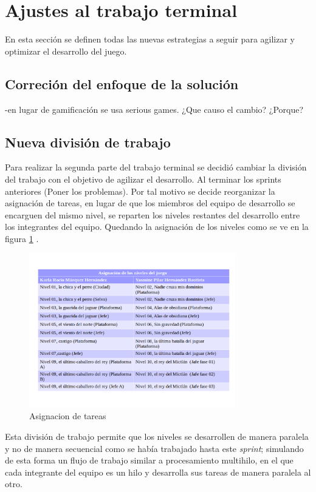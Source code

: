 \section{Ajustes al trabajo terminal}
En esta sección se definen todas las nuevas estrategias a seguir para agilizar y 
optimizar el desarrollo del juego.

\subsection{Correción del enfoque de la solución}
-en lugar de gamificación se usa serious games. ¿Que causo el cambio? ¿Porque?


\subsection{Nueva división de trabajo}
Para realizar la segunda parte del trabajo terminal se decidió cambiar la división del trabajo con el objetivo de agilizar el desarrollo. Al terminar los sprints anteriores (Poner los problemas). Por tal motivo se decide reorganizar la asignación de 
tareas, en lugar de que los miembros del equipo de desarrollo se encarguen del 
mismo nivel, se reparten los niveles restantes del desarrollo entre los 
integrantes del equipo. Quedando la asignación de los niveles como se ve en la 
figura \ref{fig:Tareas} .

		\begin{figure}[h]
    			\centering
    			\includegraphics[width=0.8\textwidth]{02Antecedentes/Imagenes/tareasAsignacion.png}
    			\caption{Asignacion de tareas}
    			\label{fig:Tareas}
		\end{figure}


Esta división de trabajo permite que los niveles se desarrollen de manera paralela y no de manera secuencial como se había trabajado hasta este \textit{sprint}; simulando de esta forma un flujo de trabajo similar a procesamiento multihilo, en el que cada integrante del equipo es un hilo y desarrolla sus tareas de manera paralela al otro.

